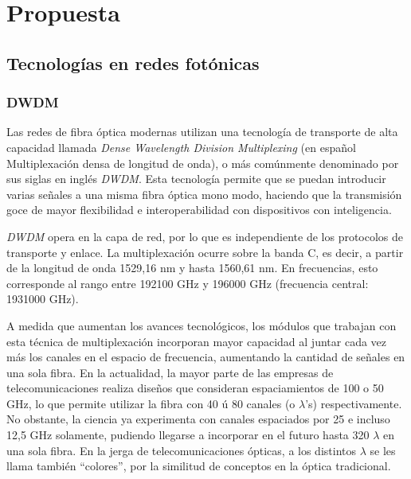 \section{Propuesta}
\label{sec:propuesta}

\subsection{Tecnologías en redes fotónicas}
\label{sec:redfotonica}

\subsubsection{DWDM}
\label{sec:dwdm}

Las redes de fibra óptica modernas utilizan una tecnología de
transporte de alta capacidad llamada \emph{Dense Wavelength Division
  Multiplexing} (en español Multiplexación densa de longitud de onda),
o más comúnmente denominado por sus siglas en inglés \emph{DWDM}. Esta
tecnología permite que se puedan introducir varias señales a una misma
fibra óptica mono modo, haciendo que la transmisión goce de mayor
flexibilidad e interoperabilidad con dispositivos con inteligencia.

\emph{DWDM} opera en la capa de red, por lo que es independiente de
los protocolos de transporte y enlace. La multiplexación ocurre sobre
la banda C, es decir, a partir de la longitud de onda 1529,16 nm y
hasta 1560,61 nm. En frecuencias, esto corresponde al rango entre
192100 GHz y 196000 GHz (frecuencia central: 1931000 GHz).

A medida que aumentan los avances tecnológicos, los módulos que
trabajan con esta técnica de multiplexación incorporan mayor capacidad
al juntar cada vez más los canales en el espacio de frecuencia,
aumentando la cantidad de señales en una sola fibra. En la actualidad,
la mayor parte de las empresas de telecomunicaciones realiza diseños
que consideran espaciamientos de 100 o 50 GHz, lo que permite utilizar
la fibra con 40 ú 80 canales (o $\lambda$'s) respectivamente. No
obstante, la ciencia ya experimenta con canales espaciados por 25 e
incluso 12,5 GHz solamente, pudiendo llegarse a incorporar en el
futuro hasta 320 $\lambda$ en una sola fibra. En la jerga de
telecomunicaciones ópticas, a los distintos $\lambda$ se les llama
también ``colores'', por la similitud de conceptos en la óptica
tradicional.

